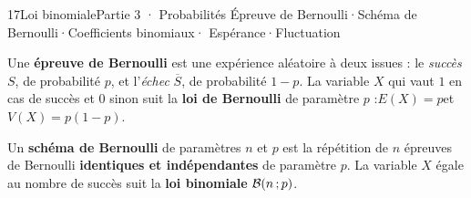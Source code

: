 
\begin{ouverture}[binomiale]{17}{Loi binomiale}{Partie 3 · Probabilités}
  {Épreuve de Bernoulli\enspace·\enspace Schéma de Bernoulli\enspace·\enspace Coefficients binomiaux\enspace·\enspace
   Espérance\enspace·\enspace Fluctuation}
\end{ouverture}

\essentiel


\begin{definition}
Une \textbf{épreuve de Bernoulli} est une expérience aléatoire à deux issues : le \emph{succès} $S$, de probabilité $p$, et
l'\emph{échec} $\overline S$, de probabilité $1-p$. La variable $X$ qui vaut $1$ en cas de succès et $0$ sinon suit la
\textbf{loi de Bernoulli} de paramètre $p$ :\qquad $E(X)=p$\qquad et\qquad $V(X)=p(1-p)$.
\end{definition}


\begin{definition}
Un \textbf{schéma de Bernoulli} de paramètres $n$ et $p$ est la répétition de $n$ épreuves de Bernoulli \textbf{identiques et
indépendantes} de paramètre $p$. La variable $X$ égale au nombre de succès suit la \textbf{loi binomiale} $\mathcal{B}(n\,{;}\, p)$.
\end{definition}

